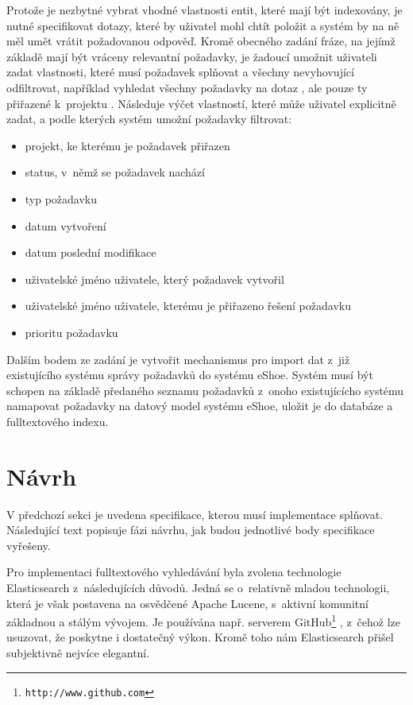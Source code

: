 \documentclass[11pt,oneside]{fithesis2}
\begin{document}
Protože je nezbytné vybrat vhodné vlastnosti entit, které mají být indexovány, je nutné specifikovat dotazy, které by uživatel mohl chtít položit a systém by na ně měl umět vrátit požadovanou odpověď. Kromě obecného zadání fráze, na jejímž základě mají být vráceny relevantní požadavky, je žadoucí umožnit uživateli zadat vlastnosti, které musí požadavek splňovat a všechny nevyhovující odfiltrovat, například vyhledat všechny požadavky na dotaz , ale pouze ty přiřazené k~projektu . Následuje výčet vlastností, které může uživatel explicitně zadat, a podle kterých systém umožní požadavky filtrovat:
\begin{itemize}
	\item projekt, ke kterému je požadavek přiřazen
	\item status, v~němž se požadavek nachází
	\item typ požadavku
	\item datum vytvoření
	\item datum poslední modifikace
	\item uživatelské jméno uživatele, který požadavek vytvořil
	\item uživatelské jméno uživatele, kterému je přiřazeno řešení požadavku
	\item prioritu požadavku	 
\end{itemize}

Dalším bodem ze zadání je vytvořit mechanismus pro import dat z~již existujícího systému správy požadavků do systému eShoe. Systém musí být schopen na základě předaného seznamu požadavků z~onoho existujícícho systému namapovat požadavky na datový model systému eShoe, uložit je do databáze a fulltextového indexu.

\section{Návrh}
V předchozí sekci je uvedena specifikace, kterou musí implementace splňovat. Následující text popisuje fázi návrhu, jak budou jednotlivé body specifikace vyřešeny. 

Pro implementaci fulltextového vyhledávání byla zvolena technologie Elasticsearch z~následujících důvodů. Jedná se o~relativně mladou technologii, která je však postavena na osvědčené Apache Lucene, s~aktivní komunitní základnou a stálým vývojem. Je používána např. serverem GitHub\footnote{\texttt{http://www.github.com}} \cite{ElasticsearchDefinitiveGuide}, z~čehož lze usuzovat, že poskytne i dostatečný výkon. Kromě toho nám Elasticsearch přišel subjektivně nejvíce elegantní.
\end{document}

